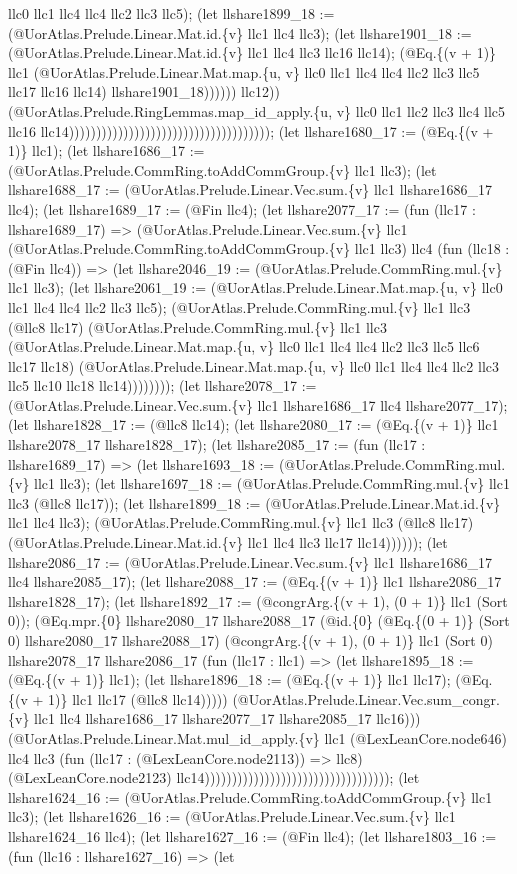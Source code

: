 \documentclass[11pt]{article}
\begin{document}
llc0 llc1 llc4 llc4 llc2 llc3 llc5); (let llshare1899\_18 := (@UorAtlas.Prelude.Linear.Mat.id.\{v\} llc1 llc4 llc3); (let llshare1901\_18 := (@UorAtlas.Prelude.Linear.Mat.id.\{v\} llc1 llc4 llc3 llc16 llc14); (@Eq.\{(v + 1)\} llc1 (@UorAtlas.Prelude.Linear.Mat.map.\{u, v\} llc0 llc1 llc4 llc4 llc2 llc3 llc5 llc17 llc16 llc14) llshare1901\_18)))))) llc12)) (@UorAtlas.Prelude.RingLemmas.map\_id\_apply.\{u, v\} llc0 llc1 llc2 llc3 llc4 llc5 llc16 llc14))))))))))))))))))))))))))))))))))))); (let llshare1680\_17 := (@Eq.\{(v + 1)\} llc1); (let llshare1686\_17 := (@UorAtlas.Prelude.CommRing.toAddCommGroup.\{v\} llc1 llc3); (let llshare1688\_17 := (@UorAtlas.Prelude.Linear.Vec.sum.\{v\} llc1 llshare1686\_17 llc4); (let llshare1689\_17 := (@Fin llc4); (let llshare2077\_17 := (fun (llc17 : llshare1689\_17) => (@UorAtlas.Prelude.Linear.Vec.sum.\{v\} llc1 (@UorAtlas.Prelude.CommRing.toAddCommGroup.\{v\} llc1 llc3) llc4 (fun (llc18 : (@Fin llc4)) => (let llshare2046\_19 := (@UorAtlas.Prelude.CommRing.mul.\{v\} llc1 llc3); (let llshare2061\_19 := (@UorAtlas.Prelude.Linear.Mat.map.\{u, v\} llc0 llc1 llc4 llc4 llc2 llc3 llc5); (@UorAtlas.Prelude.CommRing.mul.\{v\} llc1 llc3 (@llc8 llc17) (@UorAtlas.Prelude.CommRing.mul.\{v\} llc1 llc3 (@UorAtlas.Prelude.Linear.Mat.map.\{u, v\} llc0 llc1 llc4 llc4 llc2 llc3 llc5 llc6 llc17 llc18) (@UorAtlas.Prelude.Linear.Mat.map.\{u, v\} llc0 llc1 llc4 llc4 llc2 llc3 llc5 llc10 llc18 llc14)))))))); (let llshare2078\_17 := (@UorAtlas.Prelude.Linear.Vec.sum.\{v\} llc1 llshare1686\_17 llc4 llshare2077\_17); (let llshare1828\_17 := (@llc8 llc14); (let llshare2080\_17 := (@Eq.\{(v + 1)\} llc1 llshare2078\_17 llshare1828\_17); (let llshare2085\_17 := (fun (llc17 : llshare1689\_17) => (let llshare1693\_18 := (@UorAtlas.Prelude.CommRing.mul.\{v\} llc1 llc3); (let llshare1697\_18 := (@UorAtlas.Prelude.CommRing.mul.\{v\} llc1 llc3 (@llc8 llc17)); (let llshare1899\_18 := (@UorAtlas.Prelude.Linear.Mat.id.\{v\} llc1 llc4 llc3); (@UorAtlas.Prelude.CommRing.mul.\{v\} llc1 llc3 (@llc8 llc17) (@UorAtlas.Prelude.Linear.Mat.id.\{v\} llc1 llc4 llc3 llc17 llc14)))))); (let llshare2086\_17 := (@UorAtlas.Prelude.Linear.Vec.sum.\{v\} llc1 llshare1686\_17 llc4 llshare2085\_17); (let llshare2088\_17 := (@Eq.\{(v + 1)\} llc1 llshare2086\_17 llshare1828\_17); (let llshare1892\_17 := (@congrArg.\{(v + 1), (0 + 1)\} llc1 (Sort 0)); (@Eq.mpr.\{0\} llshare2080\_17 llshare2088\_17 (@id.\{0\} (@Eq.\{(0 + 1)\} (Sort 0) llshare2080\_17 llshare2088\_17) (@congrArg.\{(v + 1), (0 + 1)\} llc1 (Sort 0) llshare2078\_17 llshare2086\_17 (fun (llc17 : llc1) => (let llshare1895\_18 := (@Eq.\{(v + 1)\} llc1); (let llshare1896\_18 := (@Eq.\{(v + 1)\} llc1 llc17); (@Eq.\{(v + 1)\} llc1 llc17 (@llc8 llc14))))) (@UorAtlas.Prelude.Linear.Vec.sum\_congr.\{v\} llc1 llc4 llshare1686\_17 llshare2077\_17 llshare2085\_17 llc16))) (@UorAtlas.Prelude.Linear.Mat.mul\_id\_apply.\{v\} llc1 (@LexLeanCore.node646) llc4 llc3 (fun (llc17 : (@LexLeanCore.node2113)) => llc8) (@LexLeanCore.node2123) llc14)))))))))))))))))))))))))))))))))); (let llshare1624\_16 := (@UorAtlas.Prelude.CommRing.toAddCommGroup.\{v\} llc1 llc3); (let llshare1626\_16 := (@UorAtlas.Prelude.Linear.Vec.sum.\{v\} llc1 llshare1624\_16 llc4); (let llshare1627\_16 := (@Fin llc4); (let llshare1803\_16 := (fun (llc16 : llshare1627\_16) => (let 
\end{document}
